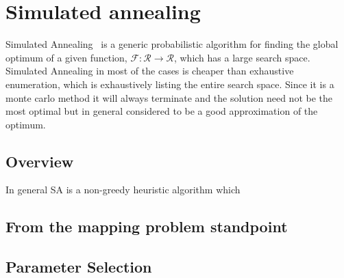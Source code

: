 
\section{Simulated annealing}
\label{sec:simulated-annealing}

Simulated Annealing~\cite{kirkpatrick} is a generic probabilistic algorithm for
finding the global optimum of a given function,
$\mathcal{F}:\mathcal{R}\rightarrow\mathcal{R}$, which has a large search space.
Simulated Annealing in most of the cases is cheaper than exhaustive enumeration,
which is exhaustively listing the entire search space. Since it is a monte carlo
method it will always terminate and the solution need not be the most optimal
but in general considered to be a good approximation of the optimum.

\subsection{Overview}

In general SA is a non-greedy heuristic algorithm which  

\subsection{From the mapping problem standpoint}

\subsection{Parameter Selection}


